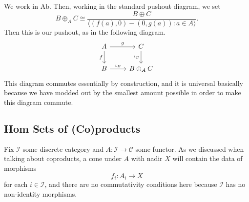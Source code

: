 \begin{example}
	We work in $\mathrm{Ab}$. Then, working in the standard pushout diagram, we set
	\[B\oplus_AC\cong\frac{B\oplus C}{\langle(f(a),0)-(0,g(a)):a\in A\rangle}.\]
	Then this is our pushout, as in the following diagram.
	\[\begin{tikzcd}
		A & C \\
		B & {B\oplus_AC}
		\arrow["f"', from=1-1, to=2-1]
		\arrow["g", from=1-1, to=1-2]
		\arrow["{\iota_C}"', from=1-2, to=2-2]
		\arrow["{\iota_B}", from=2-1, to=2-2]
	\end{tikzcd}\]
	This diagram commutes essentially by construction, and it is universal basically because we have modded out by the smallest amount possible in order to make this diagram commute.
\end{example}

\subsection{\textrm{Hom} Sets of (Co)products}
Fix $\mathcal I$ some discrete category and $A:\mathcal I\to\mathcal C$ some functor. As we discussed when talking about coproducts, a cone under $A$ with nadir $X$ will contain the data of morphisms
\[f_i:A_i\to X\]
for each $i\in\mathcal I$, and there are no commutativity conditions here because $\mathcal I$ has no non-identity morphisms.

